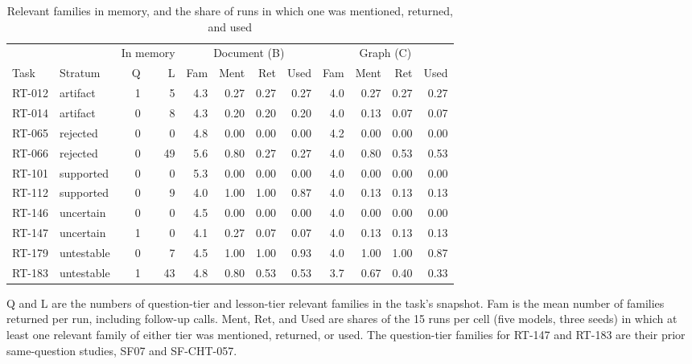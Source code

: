 \documentclass[11pt]{article}
\begin{document}
\begin{table}[ht]
\centering
\caption{Relevant families in memory, and the share of runs in which one was mentioned, returned, and used}
\label{tab:retrieval}
\small
\begin{tabular}{llrr rrrr rrrr}
\toprule
 & & \multicolumn{2}{c}{In memory} & \multicolumn{4}{c}{Document (B)} & \multicolumn{4}{c}{Graph (C)} \\
\cmidrule(lr){3-4}\cmidrule(lr){5-8}\cmidrule(lr){9-12}
Task & Stratum & Q & L & Fam & Ment & Ret & Used & Fam & Ment & Ret & Used \\
\midrule
RT-012 & artifact   & 1 & 5  & 4.3 & 0.27 & 0.27 & 0.27 & 4.0 & 0.27 & 0.27 & 0.27 \\
RT-014 & artifact   & 0 & 8  & 4.3 & 0.20 & 0.20 & 0.20 & 4.0 & 0.13 & 0.07 & 0.07 \\
RT-065 & rejected   & 0 & 0  & 4.8 & 0.00 & 0.00 & 0.00 & 4.2 & 0.00 & 0.00 & 0.00 \\
RT-066 & rejected   & 0 & 49 & 5.6 & 0.80 & 0.27 & 0.27 & 4.0 & 0.80 & 0.53 & 0.53 \\
RT-101 & supported  & 0 & 0  & 5.3 & 0.00 & 0.00 & 0.00 & 4.0 & 0.00 & 0.00 & 0.00 \\
RT-112 & supported  & 0 & 9  & 4.0 & 1.00 & 1.00 & 0.87 & 4.0 & 0.13 & 0.13 & 0.13 \\
RT-146 & uncertain  & 0 & 0  & 4.5 & 0.00 & 0.00 & 0.00 & 4.0 & 0.00 & 0.00 & 0.00 \\
RT-147 & uncertain  & 1 & 0  & 4.1 & 0.27 & 0.07 & 0.07 & 4.0 & 0.13 & 0.13 & 0.13 \\
RT-179 & untestable & 0 & 7  & 4.5 & 1.00 & 1.00 & 0.93 & 4.0 & 1.00 & 1.00 & 0.87 \\
RT-183 & untestable & 1 & 43 & 4.8 & 0.80 & 0.53 & 0.53 & 3.7 & 0.67 & 0.40 & 0.33 \\
\bottomrule
\end{tabular}

\vspace{0.4em}
\begin{minipage}{0.92\linewidth}\footnotesize
Q and L are the numbers of question-tier and lesson-tier relevant families in the task's snapshot. Fam is the mean number of families returned per run, including follow-up calls. Ment, Ret, and Used are shares of the 15 runs per cell (five models, three seeds) in which at least one relevant family of either tier was mentioned, returned, or used. The question-tier families for RT-147 and RT-183 are their prior same-question studies, SF07 and SF-CHT-057.
\end{minipage}
\end{table}
\end{document}
